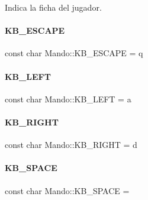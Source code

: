 Indica la ficha del jugador. 

\hypertarget{classMando_a3c4e7465d5b25fcaf8f3b50b444421a3}{}\label{classMando_a3c4e7465d5b25fcaf8f3b50b444421a3} 
\paragraph{\texorpdfstring{K\+B\+\_\+\+E\+S\+C\+A\+PE}{KB\_ESCAPE}}
{\footnotesize\ttfamily const char Mando\+::\+K\+B\+\_\+\+E\+S\+C\+A\+PE = \textquotesingle{}q\textquotesingle{}\hspace{0.3cm}{\ttfamily [static]}}

\hypertarget{classMando_a61277e93015f5d44d37416f1475be542}{}\label{classMando_a61277e93015f5d44d37416f1475be542} 
\paragraph{\texorpdfstring{K\+B\+\_\+\+L\+E\+FT}{KB\_LEFT}}
{\footnotesize\ttfamily const char Mando\+::\+K\+B\+\_\+\+L\+E\+FT = \textquotesingle{}a\textquotesingle{}\hspace{0.3cm}{\ttfamily [static]}}

\hypertarget{classMando_a75b32aa31a64931f62c5737b8f09bf39}{}\label{classMando_a75b32aa31a64931f62c5737b8f09bf39} 
\paragraph{\texorpdfstring{K\+B\+\_\+\+R\+I\+G\+HT}{KB\_RIGHT}}
{\footnotesize\ttfamily const char Mando\+::\+K\+B\+\_\+\+R\+I\+G\+HT = \textquotesingle{}d\textquotesingle{}\hspace{0.3cm}{\ttfamily [static]}}

\hypertarget{classMando_ade68606cf2abf043c08e281d1531c78a}{}\label{classMando_ade68606cf2abf043c08e281d1531c78a} 
\paragraph{\texorpdfstring{K\+B\+\_\+\+S\+P\+A\+CE}{KB\_SPACE}}
{\footnotesize\ttfamily const char Mando\+::\+K\+B\+\_\+\+S\+P\+A\+CE = \textquotesingle{} \textquotesingle{}\hspace{0.3cm}{\ttfamily [static]}}

